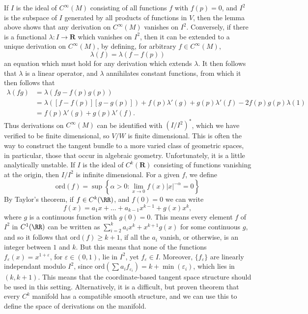 \begin{remark}
If $I$ is the ideal of $C^\infty(M)$ consisting of all functions $f$ with $f(p) = 0$, and $I^2$ is the subspace of $I$ generated by all products of functions in $V$, then the lemma above shows that any derivation on $C^\infty(M)$ vanishes on $I^2$. Conversely, if there is a functional $\lambda: I \to \mathbf{R}$ which vanishes on $I^2$, then it can be extended to a unique derivation on $C^\infty(M)$, by defining, for arbitrary $f \in C^\infty(M)$,
%
\[ \lambda(f) = \lambda(f - f(p)) \]
%
an equation which must hold for any derivation which extends $\lambda$. It then follows that $\lambda$ is a linear operator, and $\lambda$ annihilates constant functions, from which it then follows that
%
\begin{align*}
    \lambda(fg) &= \lambda(fg - f(p)g(p))\\
    &= \lambda([f - f(p)][g - g(p)]) + f(p) \lambda'(g) + g(p) \lambda'(f) - 2 f(p) g(p) \lambda(1)\\
    &= f(p) \lambda'(g) + g(p) \lambda'(f).
\end{align*}
%
Thus derivations on $C^\infty(M)$ can be identified with $(I/I^2)^*$, which we have verified to be finite dimensional, so $V/W$ is finite dimensional. This is often the way to construct the tangent bundle to a more varied class of geometric spaces, in particular, those that occur in algebraic geometry. Unfortunately, it is a little analytically unstable. If $I$ is the ideal of $C^k(\mathbf{R})$ consisting of functions vanishing at the origin, then $I/I^2$
 is infinite dimensional. For a given $f$, we define
 \[ \text{ord}(f) = \sup \left\{ \alpha > 0 : \lim_{x \to 0} f(x) |x|^{-\alpha} = 0 \right\} \]
 By Taylor's theorem, if $f \in C^k(\RR)$, and $f(0) = 0$ we can write
 \[ f(x) = a_1x + \dots + a_{k-1} x^{k-1} + g(x) x^k, \]
 where $g$ is a continuous function with $g(0) = 0$. This means every element $f$ of $I^2$ in $C^1(\RR)$ can be written as $\sum_{i = 2}^k a_i x^k + x^{k+1} g(x)$ for some continuous $g$, and so it follows that $\text{ord}(f) \geq k+1$, if all the $a_i$ vanish, or otherwise, is an integer between $1$ and $k$. But this means that none of the functions $f_\varepsilon(x) = x^{1 + \varepsilon}$, for $\varepsilon \in (0,1)$, lie in $I^2$, yet $f_\varepsilon \in I$. Moreover, $\{ f_\varepsilon \}$ are linearly independant modulo $I^2$, since $\text{ord}(\sum a_i f_{\varepsilon_i}) = k + \min(\varepsilon_i)$, which lies in $(k,k+1)$. This means that the coordinate-based tangent space structure should be used in this setting. Alternatively, it is a difficult, but proven theorem that every $C^k$ manifold has a compatible smooth structure, and we can use this to define the space of derivations on the manifold.
\end{remark}


